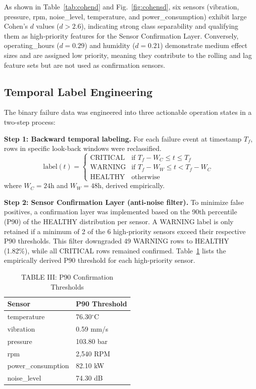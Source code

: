 \documentclass[conference]{IEEEtran}
\begin{document}
As shown in Table~\ref{tab:cohend} and Fig.~\ref{fig:cohensd}, six sensors (vibration, pressure, rpm, noise\_level, temperature, and power\_consumption) exhibit large Cohen's $d$ values ($d > 2.6$), indicating strong class separability and qualifying them as high-priority features for the Sensor Confirmation Layer. Conversely, operating\_hours ($d=0.29$) and humidity ($d=0.21$) demonstrate medium effect sizes and are assigned low priority, meaning they contribute to the rolling and lag feature sets but are not used as confirmation sensors.

\subsection{Temporal Label Engineering}
The binary failure data was engineered into three actionable operation states in a two-step process:

\textbf{Step 1: Backward temporal labeling.}
For each failure event at timestamp $T_f$, rows in specific look-back windows were reclassified. 
\begin{equation}
\text{label}(t) = \begin{cases}
\text{CRITICAL} & \text{if } T_f - W_C \leq t \leq T_f \\
\text{WARNING}  & \text{if } T_f - W_W \leq t < T_f - W_C \\
\text{HEALTHY}  & \text{otherwise}
\end{cases}
\label{eq:labeling}
\end{equation}
where $W_C = 24$h and $W_W = 48$h, derived empirically.

\textbf{Step 2: Sensor Confirmation Layer (anti-noise filter).}
To minimize false positives, a confirmation layer was implemented based on the 90th percentile (P90) of the HEALTHY distribution per sensor. A WARNING label is only retained if a minimum of 2 of the 6 high-priority sensors exceed their respective P90 thresholds. This filter downgraded 49 WARNING rows to HEALTHY (1.82\%), while all CRITICAL rows remained confirmed. Table~\ref{tab:p90_thresholds} lists the empirically derived P90 threshold for each high-priority sensor.

\begin{table}[htbp]
\caption{TABLE III: P90 Confirmation Thresholds}
\centering
\begin{tabular}{ll}
\hline
\textbf{Sensor} & \textbf{P90 Threshold} \\
\hline
temperature & 76.30$^\circ$C \\
vibration & 0.59 mm/s \\
pressure & 103.80 bar \\
rpm & 2,540 RPM \\
power\_consumption & 82.10 kW \\
noise\_level & 74.30 dB \\
\hline
\end{tabular}
\label{tab:p90_thresholds}
\end{table}
\end{document}
